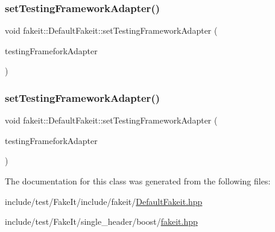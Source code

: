 \subsubsection{\texorpdfstring{setTestingFrameworkAdapter()}{setTestingFrameworkAdapter()}\hspace{0.1cm}{\footnotesize\ttfamily [8/9]}}
{\footnotesize\ttfamily void fakeit\+::\+Default\+Fakeit\+::set\+Testing\+Framework\+Adapter (\begin{DoxyParamCaption}\item[{\mbox{\hyperlink{structfakeit_1_1EventHandler}{fakeit\+::\+Event\+Handler}} \&}]{testing\+Framefork\+Adapter }\end{DoxyParamCaption})\hspace{0.3cm}{\ttfamily [inline]}}

\mbox{\label{classfakeit_1_1DefaultFakeit_a7e5375cb58acb0e27a374a32ecf37b5a}} 
\subsubsection{\texorpdfstring{setTestingFrameworkAdapter()}{setTestingFrameworkAdapter()}\hspace{0.1cm}{\footnotesize\ttfamily [9/9]}}
{\footnotesize\ttfamily void fakeit\+::\+Default\+Fakeit\+::set\+Testing\+Framework\+Adapter (\begin{DoxyParamCaption}\item[{\mbox{\hyperlink{structfakeit_1_1EventHandler}{fakeit\+::\+Event\+Handler}} \&}]{testing\+Framefork\+Adapter }\end{DoxyParamCaption})\hspace{0.3cm}{\ttfamily [inline]}}



The documentation for this class was generated from the following files\+:\begin{DoxyCompactItemize}
\item 
include/test/\+Fake\+It/include/fakeit/\mbox{\hyperlink{DefaultFakeit_8hpp}{Default\+Fakeit.\+hpp}}\item 
include/test/\+Fake\+It/single\+\_\+header/boost/\mbox{\hyperlink{single__header_2boost_2fakeit_8hpp}{fakeit.\+hpp}}\end{DoxyCompactItemize}

